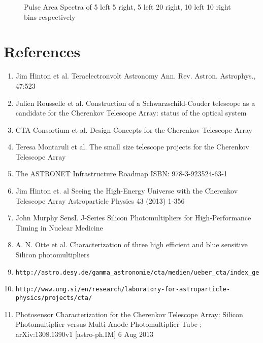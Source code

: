 \documentclass[12pt,article,type=msc,colorback,accentcolor=tud9c]{tudthesis}
\begin{document}
\begin{figure}[h]
\begin{centering}
\caption{Pulse Area Spectra of 5 left 5 right, 5 left 20 right, 10 left 10 right bins respectively}
\label{fig:PAS_window}
\end{centering}
\end{figure}


\newpage
\newpage
\section{References}
\begin{enumerate}
\item Jim Hinton et al. Teraelectronvolt Astronomy Ann. Rev. Astron. Astrophys., 47:523
\item Julien Rousselle et al. Construction of a Schwarzschild-Couder telescope as a candidate for the Cherenkov Telescope Array: status of the optical system
\item CTA Consortium et al. Design Concepts for the Cherenkov Telescope Array
\item Teresa Montaruli et al. The small size telescope projects for the Cherenkov Telescope Array
\item The ASTRONET Infrastructure Roadmap ISBN: 978-3-923524-63-1
\item Jim Hinton et. al Seeing the High-Energy Universe with the Cherenkov Telescope Array Astroparticle Physics 43 (2013) 1-356 
\item John Murphy SensL J-Series Silicon Photomultipliers for High-Performance Timing in Nuclear Medicine 
\item A. N. Otte et al. Characterization of three high efficient and blue sensitive Silicon photomultipliers
\item \begin{verbatim}http://astro.desy.de/gamma_astronomie/cta/medien/ueber_cta/index_ger.html\end{verbatim}
\item \label{ref10}\begin{verbatim}http://www.ung.si/en/research/laboratory-for-astroparticle-physics/projects/cta/\end{verbatim}
\item \label{ref:ref11}Photosensor Characterization for the Cherenkov Telescope Array: Silicon Photomultiplier versus Multi-Anode Photomultiplier Tube ; arXiv:1308.1390v1 [astro-ph.IM] 6 Aug 2013
\end{enumerate}
\end{document}
